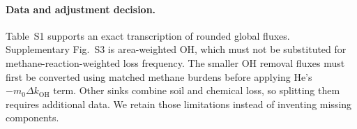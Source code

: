 \documentclass[11pt]{article}
\begin{document}
\paragraph{Data and adjustment decision.}
Table~S1 supports an exact transcription of rounded global fluxes.
Supplementary Fig.~S3 is area-weighted OH, which must not be substituted
for methane-reaction-weighted loss frequency. The smaller OH removal
fluxes must first be converted using matched methane burdens before
applying He's $-m_0\Delta k_{\mathrm{OH}}$ term. Other sinks combine
soil and chemical loss, so splitting them requires additional data.
We retain those limitations instead of inventing missing components.
\end{document}
